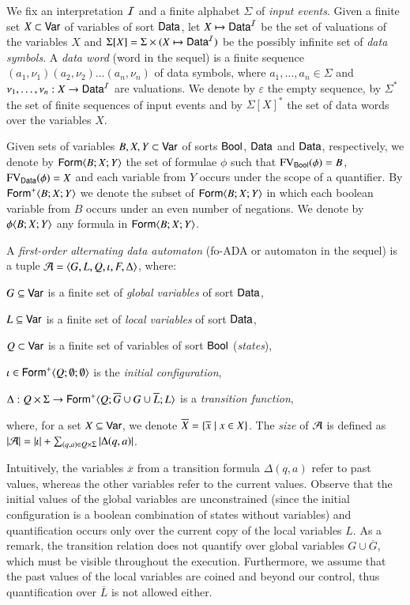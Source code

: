 \documentclass{llncs}
\begin{document}
We fix an interpretation $\mathcal{I}$ and a finite alphabet $\Sigma$ of
\emph{input events}. Given a finite set $X \subset \mathsf{Var}$ of
variables of sort $\mathsf{Data}$, let $X \mapsto \mathsf{Data}^{\mathcal{I}}$ be the set
of valuations of the variables $X$ and $\Sigma[X] = \Sigma
\times (X \mapsto \mathsf{Data}^{\mathcal{I}})$ be the possibly infinite set of
\emph{data symbols}. A \emph{data word} (word in the sequel) is a
finite sequence $(a_1,\nu_1)(a_2,\nu_2) \ldots (a_n,\nu_n)$ of data
symbols, where $a_1,\ldots,a_n \in \Sigma$ and $\nu_1,\ldots,\nu_n :
X \rightarrow \mathsf{Data}^{\mathcal{I}}$ are valuations. We denote by
$\varepsilon$ the empty sequence, by $\Sigma^*$ the set of finite
sequences of input events and by $\Sigma[X]^*$ the set of data
words over the variables $X$.

Given sets of variables $B,X,Y \subset \mathsf{Var}$ of sorts $\mathsf{Bool}$,
$\mathsf{Data}$ and $\mathsf{Data}$, respectively, we denote by $\mathsf{Form}\langle B;X;Y \rangle$
the set of formulae $\phi$ such that $\mathrm{FV}_{\mathsf{Bool}}(\phi) = B$,
$\mathrm{FV}_{\mathsf{Data}}(\phi) = X$ and each variable from $Y$ occurs under the
scope of a quantifier. By $\mathsf{Form}^+\langle B;X;Y \rangle$ we denote the subset
of $\mathsf{Form}\langle B;X;Y \rangle$ in which each boolean variable from $B$ occurs
under an even number of negations. We denote by $\phi\langle B;X;Y \rangle$
any formula in $\mathsf{Form}\langle B;X;Y \rangle$.

A \emph{first-order alternating data automaton} (fo-ADA or automaton
in the sequel) is a tuple $\mathcal{A} =
\langle G,L,Q,\iota,F,\Delta \rangle$, where: \begin{compactitem}
%
\item $G \subseteq \mathsf{Var}$ is a finite set of \emph{global
  variables} of sort $\mathsf{Data}$, 
%
\item $L \subseteq \mathsf{Var}$ is a finite set of \emph{local
  variables} of sort $\mathsf{Data}$,
%
\item $Q \subset \mathsf{Var}$ is a finite set of variables of sort $\mathsf{Bool}$
  (\emph{states}),
%
\item $\iota \in \mathsf{Form}^+\langle Q;\emptyset;\emptyset \rangle$ is the \emph{initial
  configuration},
%
\item $\Delta : Q \times \Sigma \rightarrow
  \mathsf{Form}^+\langle Q;\overline{G}\cup G\cup\overline{L};L \rangle$ is a
  \emph{transition function},
\end{compactitem}
where, for a set $X \subseteq \mathsf{Var}$, we denote $\overline{X} =
\{ \overline{x} \mid x \in X \}$. The \emph{size} of $\mathcal{A}$ is defined
as ${|{\mathcal{A}}|} = {|{\iota}|} + \sum_{(q,a) \in
  Q\times\Sigma}{|{\Delta(q,a)}|}$.

Intuitively, the variables $\overline{x}$ from a transition formula
$\Delta(q,a)$ refer to past values, whereas the other variables refer
to the current values. Observe that the initial values of the global
variables are unconstrained (since the initial configuration is a
boolean combination of states without variables) and quantification
occurs only over the current copy of the local variables $L$. As a
remark, the transition relation does not quantify over global
variables $G \cup \overline{G}$, which must be visible throughout the
execution. Furthermore, we assume that the past values of the local
variables are coined and beyond our control, thus quantification over
$\overline{L}$ is not allowed either.
\end{document}
